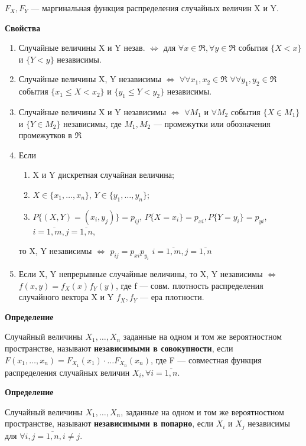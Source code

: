 $F_X, F_Y$ --- маргинальная функция распределения случайных величин X и Y.

\textbf{Свойства}

\begin{enumerate}[label=\arabic*.]
	\item Случайные величины X и Y незав. $\Leftrightarrow$ для $\forall x \in \Re, \forall y \in \Re$ события $\{X<x\}$ и $\{Y < y\}$ независимы.
	\item Случайные величины X, Y независимы $\Leftrightarrow$ $\forall \forall x_1, x_2 \in \Re$ $\forall \forall y_1, y_2 \in \Re$ события $\{x_1 \leq X < x_2\}$ и $\{y_1 \leq Y < y_2\}$ независимы.
	\item Случайные величины X и Y независимы $\Leftrightarrow$ $\forall M_1$ и $\forall M_2$ события $\{X \in M_1\}$ и $\{Y \in M_2\}$ независимы, где $M_1, M_2$ --- промежутки или обозначения промежутков в $\Re$
	\item Если \begin{enumerate}[label=\arabic*]
		\item X и Y дискретная случайная величина;
		\item $X \in \{x_1, \dots, x_n\}$, $Y \in \{y_1, \dots, y_n\}$;
		\item $P\{(X, Y)=(x_i, y_j)\} = p_{ij}$, $P\{X=x_i\}=p_{xi}, P\{Y=y_i\}=p_{yi}$, $i=\overline{1,m}, j=\overline{1,n}$,
	\end{enumerate}
	то X, Y независимы $\Leftrightarrow$ $p_{ij} = p_{xi}p_{y_i}$ $i=\overline{1,m}, j=\overline{1,n}$
	\item Если X, Y непрерывные случайные величины, то X, Y независимы $\Leftrightarrow$ $f(x, y) = f_X(x)f_Y(y)$, где f --- совм. плотность распределения случайного вектора X и Y $f_X, f_Y$ --- ера плотности.
\end{enumerate}

\textbf{Определение}

Случайный величины $X_1, \dots, X_n$ заданные на одном и том же вероятностном пространстве, называют \textbf{независимыми в совокупности}, если $F(x_1, \dots, x_n) = F_{X_1}(x_1) \cdot \dots F_{X_n}(x_n)$, где F --- совместная функция распределения случайных величин $X_i, \forall i = \overline{1,n}$.

\textbf{Определение}

Случайный величины $X_1, \dots, X_n$, заданные на одном и том же вероятностном пространстве, называют \textbf{независимыми в попарно}, если $X_i$ и $X_j$ независимы  для $\forall i,j = \overline{1,n}, i \neq j$.

